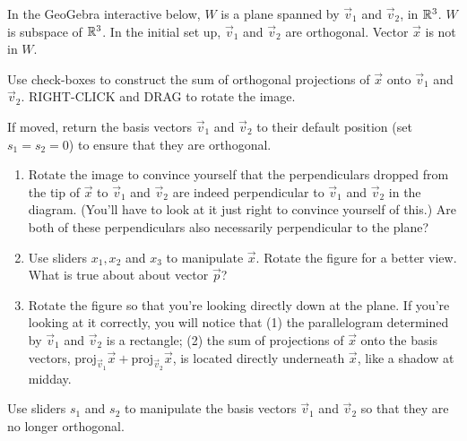 \documentclass{ximera}
\begin{document}
\begin{exploration}\label{exp:orthProjSub}
In the GeoGebra interactive below, $W$ is a plane spanned by $\vec{v}_1$ and $\vec{v}_2$, in $\mathbb{R}^3$.  $W$ is subspace of $\mathbb{R}^3$.  In the initial set up, $\vec{v}_1$ and $\vec{v}_2$ are orthogonal.  Vector $\vec{x}$ is not in $W$.  

Use check-boxes to construct the sum of orthogonal projections of $\vec{x}$ onto $\vec{v}_1$ and $\vec{v}_2$.  RIGHT-CLICK and DRAG to rotate the image.   
    \begin{center}
\end{center}

If moved, return the basis vectors $\vec{v}_1$ and $\vec{v}_2$ to their default position (set $s_1=s_2=0$) to ensure that they are orthogonal.  

\begin{enumerate}
\item Rotate the image to convince yourself that the perpendiculars dropped from the tip of $\vec{x}$ to $\vec{v}_1$ and $\vec{v}_2$ are indeed perpendicular to $\vec{v}_1$ and $\vec{v}_2$ in the diagram. (You'll have to look at it just right to convince yourself of this.)  Are both of these perpendiculars also necessarily perpendicular to the plane? 

\item Use sliders $x_1, x_2$ and $x_3$ to manipulate $\vec{x}$.  Rotate the figure for a better view.  What is true about about vector $\vec{p}$?
    
    \begin{multipleChoice}
 \end{multipleChoice}
 
  \item Rotate the figure so that you're looking directly down at the plane.  If you're looking at it correctly, you will notice that (1) the parallelogram determined by $\vec{v}_1$ and $\vec{v}_2$ is a rectangle; (2) the sum of projections of $\vec{x}$ onto the basis vectors, $\mbox{proj}_{\vec{v}_1}\vec{x}+\mbox{proj}_{\vec{v}_2}\vec{x}$, is located directly underneath $\vec{x}$, like a shadow at midday.
 \end{enumerate} 
 
 Use sliders $s_1$ and $s_2$ to manipulate the basis vectors $\vec{v}_1$ and $\vec{v}_2$ so that they are no longer orthogonal.  


\end{exploration}
\end{document}
